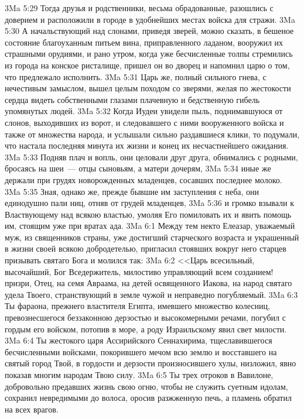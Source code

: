 \vs 3Ma 5:29 Тогда друзья и родственники, весьма обрадованные, разошлись с доверием и расположили в городе в удобнейших местах войска для стражи.
\vs 3Ma 5:30 А начальствующий над слонами, приведя зверей, можно сказать, в бешеное состояние благоуханным питьем вина, приправленного ладаном, вооружил их страшными орудиями, и рано утром, когда уже бесчисленные толпы стремились из города на конское ристалище, пришел он во дворец и напомнил царю о том, что предлежало исполнить.
\vs 3Ma 5:31 Царь же, полный сильного гнева, с нечестивым замыслом, вышел целым походом со зверями, желая по жестокости сердца видеть собственными глазами плачевную и бедственную гибель упомянутых людей.
\vs 3Ma 5:32 Когда Иудеи увидели пыль, поднимавшуюся от слонов, выходивших из ворот, и следовавшего с ними вооруженного войска и также от множества народа, и услышали сильно раздавшиеся клики, то подумали, что настала последняя минута их жизни и конец их несчастнейшего ожидания.
\vs 3Ma 5:33 Подняв плач и вопль, они целовали друг друга, обнимались с родными, бросаясь на шеи~--- отцы сыновьям, а матери дочерям,
\vs 3Ma 5:34 иные же держали при грудях новорожденных младенцев, сосавших последнее молоко.
\vs 3Ma 5:35 Зная, однако же, прежде бывшие им заступления с неба, они единодушно пали ниц, отняв от грудей младенцев,
\vs 3Ma 5:36 и громко взывали к Властвующему над всякою властью, умоляя Его помиловать их и явить помощь им, стоящим уже при вратах ада.
\vs 3Ma 6:1 Между тем некто Елеазар, уважаемый муж, из священников страны, уже достигший старческого возраста и украшенный в жизни своей всякою добродетелью, пригласил стоявших вокруг него старцев призывать святаго Бога и молился так:
\vs 3Ma 6:2 <<Царь всесильный, высочайший, Бог Вседержитель, милостиво управляющий всем созданием! призри, Отец, на семя Авраама, на детей освященного Иакова, на народ святаго удела Твоего, странствующий в земле чужой и неправедно погубляемый.
\vs 3Ma 6:3 Ты фараона, прежнего властителя Египта, имевшего множество колесниц, превознесшегося беззаконною дерзостью и высокомерными речами, погубил с гордым его войском, потопив в море, а роду Израильскому явил свет милости.
\vs 3Ma 6:4 Ты жестокого царя Ассирийского Сеннахирима, тщеславившегося бесчисленными войсками, покорившего мечом всю землю и восставшего на святый город Твой, в гордости и дерзости произносившего хулы, низложил, явно показав многим народам Твою силу.
\vs 3Ma 6:5 Ты трех отроков в Вавилоне, добровольно предавших жизнь свою огню, чтобы не служить суетным идолам, сохранил невредимыми до волоса, оросив разжженную печь, а пламень обратил на всех врагов.
